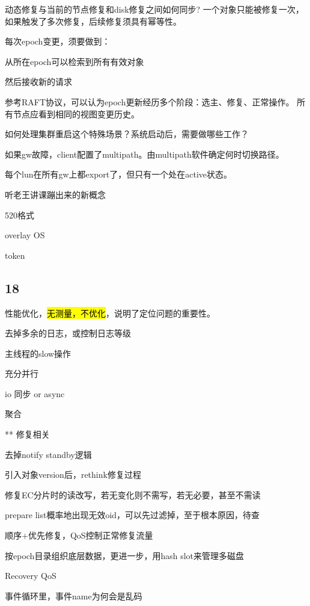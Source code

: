 动态修复与当前的节点修复和disk修复之间如何同步? 一个对象只能被修复一次，如果触发了多次修复，后续修复须具有幂等性。

每次epoch变更，须要做到：
\begin{enumbox}
\item 从所在epoch可以检索到所有有效对象
\item 然后接收新的请求
\end{enumbox}

参考RAFT协议，可以认为epoch更新经历多个阶段：选主、修复、正常操作。
所有节点应看到相同的视图变更历史。

如何处理集群重启这个特殊场景？系统启动后，需要做哪些工作？

\hrulefill

如果gw故障，client配置了multipath。由multipath软件确定何时切换路径。

每个lun在所有gw上都export了，但只有一个处在active状态。

\hrulefill

听老王讲课蹦出来的新概念
\begin{enumbox}
\item 520格式
\item overlay OS
\item token
\end{enumbox}

\subsection{18}

性能优化，\hl{无测量，不优化}，说明了定位问题的重要性。
\begin{enumbox}
\item 去掉多余的日志，或控制日志等级
\item 主线程的slow操作
\item 充分并行
\item io 同步 or async
\item 聚合
\item *** 修复相关
\item 去掉notify standby逻辑
\item 引入对象version后，rethink修复过程
\item 修复EC分片时的读改写，若无变化则不需写，若无必要，甚至不需读
\item prepare list概率地出现无效oid，可以先过滤掉，至于根本原因，待查
\item 顺序+优先修复，QoS控制正常修复流量
\item 按epoch目录组织底层数据，更进一步，用hash slot来管理多磁盘
\item Recovery QoS
\item 事件循环里，事件name为何会是乱码
\end{enumbox}

